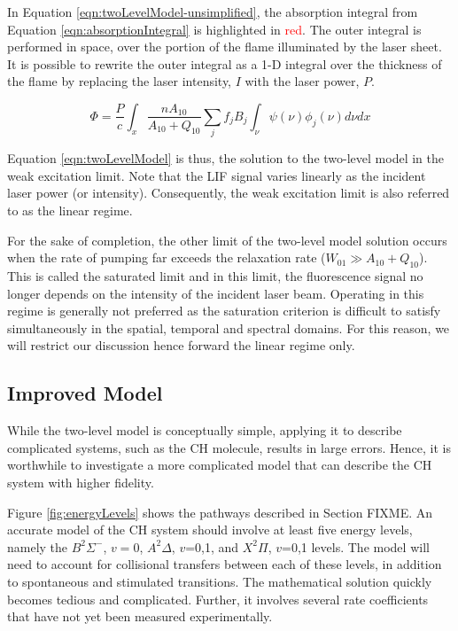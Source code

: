 In Equation \ref{eqn:twoLevelModel-unsimplified}, the absorption integral from Equation \ref{eqn:absorptionIntegral} is highlighted in \textcolor{red}{red}.
The outer integral is performed in space, over the portion of the flame illuminated by the laser sheet.
It is possible to rewrite the outer integral as a 1-D integral over the thickness of the flame by replacing the laser intensity, \(I\) with the laser power, \(P\).

\begin{equation}
  \Phi = \frac{P}{c} \int_x \frac{n A_{10}}{A_{10}+Q_{10}} \sum_j f_j B_j \int_\nu \psi(\nu) \phi_j(\nu) d\nu dx
  \label{eqn:twoLevelModel}
\end{equation}

Equation \ref{eqn:twoLevelModel} is thus, the solution to the two-level model in the weak excitation limit.
Note that the LIF signal varies linearly as the incident laser power (or intensity).
Consequently, the weak excitation limit is also referred to as the linear regime.

For the sake of completion, the other limit of the two-level model solution occurs when the rate of pumping far exceeds the relaxation rate (\(W_{01} \gg A_{10} + Q_{10}\)).
This is called the saturated limit and in this limit, the fluorescence signal no longer depends on the intensity of the incident laser beam.
Operating in this regime is generally not preferred as the saturation criterion is difficult to satisfy simultaneously in the spatial, temporal and spectral domains.
For this reason, we will restrict our discussion hence forward the linear regime only.

\subsection{Improved Model}

While the two-level model is conceptually simple, applying it to describe complicated systems, such as the CH molecule, results in large errors.\cite{1997-daily}
Hence, it is worthwhile to investigate a more complicated model that can describe the CH system with higher fidelity.



Figure \ref{fig:energyLevels} shows the pathways described in Section FIXME.
An accurate model of the CH system should involve at least five energy levels, namely the \(B^2\Sigma^-\), \(v=0\), \(A^2\Delta\), \(v\)=0,1, and \(X^2\Pi\), \(v\)=0,1 levels.
The model will need to account for collisional transfers between each of these levels, in addition to spontaneous and stimulated transitions.
The mathematical solution quickly becomes tedious and complicated.
Further, it involves several rate coefficients that have not yet been measured experimentally.

